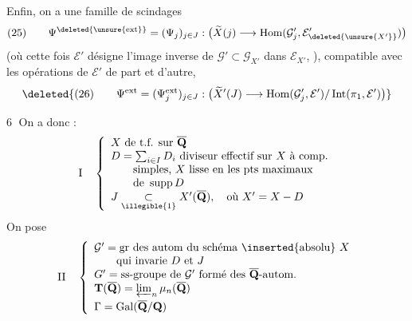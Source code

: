 Enfin, on a une famille de scindages 
\[
(25)\qquad\Psi^{\deleted{\unsure{\mathrm{ext}}}}=(\Psi_j)_{j\in J}:\bigl(\widetilde X(j)\longrightarrow\operatorname{Hom}(\mathcal G'_j,\mathcal E'_{\deleted{\unsure{X'}}})\bigr)
\]
(où cette fois $\mathcal E'$ désigne l'image inverse
de $\mathcal G'\subset\mathcal G_{X'}$ dans $\mathcal E_{X'}$, ), compatible
avec les opérations de $\mathcal E'$ de part et
d'autre, 
\[
\deleted{(26)\qquad\Psi^{\mathrm{ext}}=(\Psi_j^{\mathrm{ext}})_{j\in J}:\bigl(\widetilde X'(J)\longrightarrow\operatorname{Hom}(\mathcal G'_j,\mathcal E')/\operatorname{Int}(\pi_1,\mathcal E')\bigr)}
\]

\textcircled{6}  On a donc : 
\[
\mathrm I\quad\left\{\begin{array}{l}
X\text{ de t.f. sur }\overline{\mathbf Q}\\
D=\sum_{i\in I}D_i\text{ diviseur effectif sur }X\text{ à comp.}\\
\qquad\text{simples, }X\text{ lisse en les pts maximaux}\\
\qquad\text{de }\operatorname{supp}D\\
J\underset{\text{\illegible{1}}}{\subset}X'(\overline{\mathbf Q}),\quad\text{où }X'=X-D
\end{array}\right.
\]
On pose\margin{\unsure{(}}
\[
\mathrm{II}\quad\left\{\begin{array}{l}
\mathcal G'=\text{gr des autom du schéma \inserted{absolu} }X\\
\qquad\text{qui invarie }D\text{ et }J\\
G'=\text{ss-groupe de }\mathcal G'\text{ formé des }\overline{\mathbf Q}\text{-autom.}\\
\mathbf T(\overline{\mathbf Q})=\varprojlim_n\mu_n(\overline{\mathbf Q})\\[1ex]
\Gamma=\operatorname{Gal}(\overline{\mathbf Q}/\mathbf Q)
\end{array}\right.
\]
